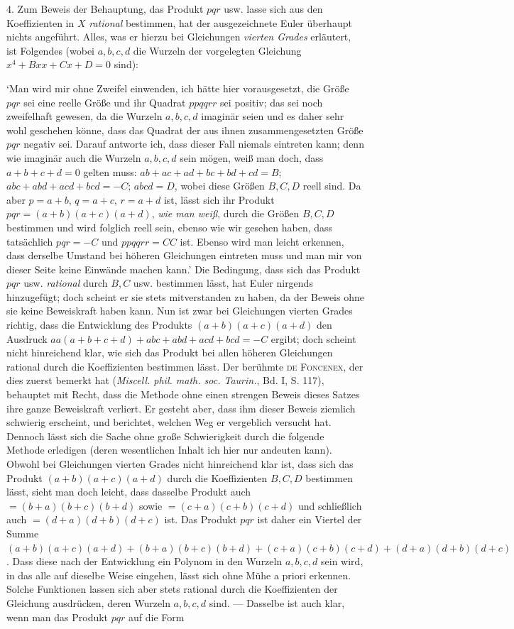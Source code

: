 4. Zum Beweis der Behauptung, das Produkt $pqr$ usw. lasse sich aus den Koeffizienten in $X$ \textit{rational} bestimmen, hat der ausgezeichnete Euler überhaupt nichts angeführt. Alles, was er hierzu bei Gleichungen \textit{vierten Grades} erläutert, ist Folgendes (wobei $a,b,c,d$ die Wurzeln der vorgelegten Gleichung $x^4+Bxx+Cx+D=0$ sind):

\lq Man wird mir ohne Zweifel einwenden, ich hätte hier vorausgesetzt, die Größe $pqr$ sei eine reelle Größe und ihr Quadrat $ppqqrr$ sei positiv; das sei noch zweifelhaft gewesen, da die Wurzeln $a,b,c,d$ imaginär seien und es daher sehr wohl geschehen könne, dass das Quadrat der aus ihnen zusammengesetzten Größe $pqr$ negativ sei. Darauf antworte ich, dass dieser Fall niemals eintreten kann; denn wie imaginär auch die Wurzeln $a,b,c,d$ sein mögen, weiß man doch, dass $a+b+c+d=0$ gelten muss: $ab+ac+ad+bc+bd+cd=B$; $abc+abd+acd+bcd=-C$; $abcd=D$, wobei diese Größen $B,C,D$ reell sind. Da aber $p=a+b$, $q=a+c$, $r=a+d$ ist, lässt sich ihr Produkt \mbox{$pqr=(a+b)(a+c)(a+d)$}, \textit{wie man weiß}, durch die Größen $B,C,D$ bestimmen und wird folglich reell sein, ebenso wie wir gesehen haben, dass tatsächlich $pqr=-C$ und \mbox{$ppqqrr=CC$} ist. Ebenso wird man leicht erkennen, dass derselbe Umstand bei höheren Gleichungen eintreten muss und man mir von dieser Seite keine Einwände machen kann.\rq{}
Die Bedingung, dass sich das Produkt $pqr$ usw. \textit{rational} durch $B,C$ usw. bestimmen lässt, hat Euler nirgends hinzugefügt; doch scheint er sie stets mitverstanden zu haben, da der Beweis ohne sie keine Beweiskraft haben kann. Nun ist zwar bei Gleichungen vierten Grades richtig, dass die Entwicklung des Produkts $(a+b)(a+c)(a+d)$ den Ausdruck $aa(a+b+c+d)+abc+abd+acd+bcd=-C$ ergibt; doch scheint nicht hinreichend klar, wie sich das Produkt bei allen höheren Gleichungen rational durch die Koeffizienten bestimmen lässt. Der berühmte \textsc{de Foncenex}, der dies zuerst bemerkt hat (\textit{Miscell. phil. math. soc. Taurin.}, Bd. I, S. 117), behauptet mit Recht, dass die Methode ohne einen strengen Beweis dieses Satzes ihre ganze Beweiskraft verliert. Er gesteht aber, dass ihm dieser Beweis ziemlich schwierig erscheint, und berichtet, welchen Weg er \mbox{vergeblich} versucht hat. Dennoch lässt sich die Sache ohne große Schwierigkeit durch die folgende Methode erledigen (deren wesentlichen Inhalt ich hier nur andeuten kann). Obwohl bei Gleichungen vierten Grades nicht hinreichend klar ist, dass sich das Produkt $(a+b)(a+c)(a+d)$ durch die Koeffizienten $B,C,D$ bestimmen lässt, sieht man doch leicht, dass dasselbe Produkt auch $=(b+a)(b+c)(b+d)$ sowie $=(c+a)(c+b)(c+d)$ und schließlich auch $=(d+a)(d+b)(d+c)$ ist. Das Produkt $pqr$ ist daher ein Viertel der Summe $(a+b)(a+c)(a+d)+(b+a)(b+c)(b+d)+(c+a)(c+b)(c+d)+(d+a)(d+b)(d+c)$. Dass diese nach der Entwicklung ein Polynom in den Wurzeln $a,b,c,d$ sein wird, in das alle auf dieselbe Weise eingehen, lässt sich ohne Mühe a priori erkennen. Solche Funktionen lassen sich aber stets rational durch die Koeffizienten der Gleichung ausdrücken, deren Wurzeln $a,b,c,d$ sind. --- Dasselbe ist auch klar, wenn man das Produkt $pqr$ auf die Form

